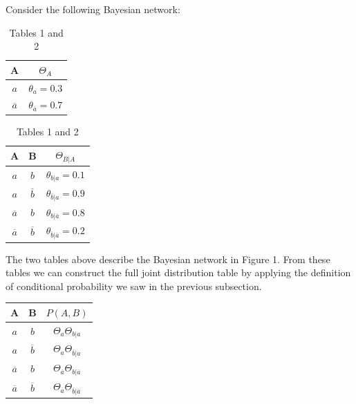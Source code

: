 \documentclass[a4paper,10pt]{article}
\theoremstyle{plain}
\begin{document}
Consider the following Bayesian network:

\begin{figure}[h]
\end{figure}

\begin{table}[h]
  \begin{center}
    \captionsetup{justification=centering}
    \begin{tabular}{c | c}
      A & $\Theta_A$ \\
      \hline
      $a$ & $\theta_a = 0.3$ \\
      $\overline{a}$ & $\theta_{\overline{a}} = 0.7$ \\
    \end{tabular}
    \quad
    \quad
    \begin{tabular}{c c | c}
      A & B & $\Theta_{B|A}$ \\
      \hline
      $a$ & $b$ & $\theta_{b|a}=0.1$ \\
      $a$ & $\overline{b}$ & $\theta_{\overline{b}|a}=0.9$ \\
      $\overline{a}$ & $b$ & $\theta_{b|\overline{a}}=0.8$ \\
      $\overline{a}$ & $\overline{b}$ & $\theta_{\overline{b}|\overline{a}}=0.2$ \\
    \end{tabular}
    \caption*{Tables 1 and 2}
  \end{center}
\end{table}
\setcounter{table}{2}

The two tables above describe the Bayesian network in Figure 1. From these tables we can construct
the full joint distribution table by applying the definition of conditional probability we saw in
the previous subsection.

\begin{table}[h]
  \begin{center}
    \captionsetup{justification=centering}
    \begin{tabular}{c c | c}
      A & B & $P(A,B)$ \\
      \hline
      $a$ & $b$ & $\Theta_a\Theta_{b|a}$ \\
      $a$ & $\overline{b}$ & $\Theta_a\Theta_{\overline{b}|a}$ \\
      $\overline{a}$ & $b$ & $\Theta_{\overline{a}}\Theta_{b|\overline{a}}$ \\
      $\overline{a}$ & $\overline{b}$ & $\Theta_{\overline{a}}\Theta_{\overline{b}|\overline{a}}$\\
    \end{tabular}
  \end{center}
\end{table}
\end{document}
